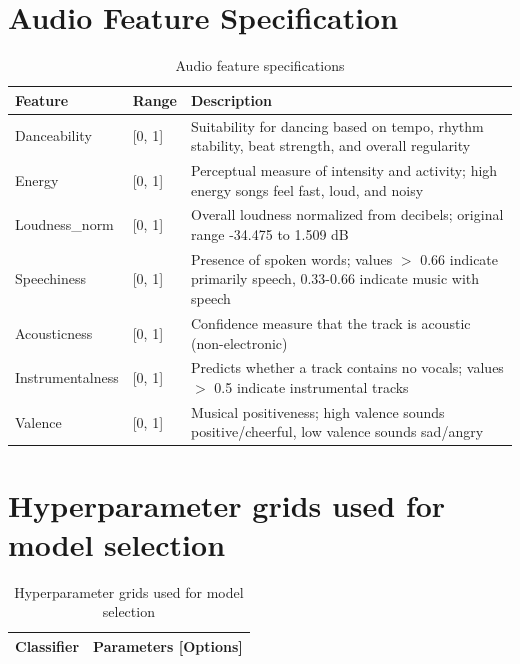 \documentclass{article}
\begin{document}
{{{{{{{\section{Audio Feature Specification}
\begin{table}[h]
\centering
\caption{Audio feature specifications}
\label{tab:Audio Feature} 
\begin{tabular}{p{3.5cm}p{2cm}p{6cm}}
\toprule
\textbf{Feature} & \textbf{Range} & \textbf{Description} \\
\midrule
Danceability & [0, 1] & Suitability for dancing based on tempo, rhythm stability, beat strength, and overall regularity \\
\midrule
Energy & [0, 1] & Perceptual measure of intensity and activity; high energy songs feel fast, loud, and noisy \\
\midrule
Loudness\_norm & [0, 1] & Overall loudness normalized from decibels; original range -34.475 to 1.509 dB \\
\midrule
Speechiness & [0, 1] & Presence of spoken words; values $>$ 0.66 indicate primarily speech, 0.33-0.66 indicate music with speech \\
\midrule
Acousticness & [0, 1] & Confidence measure that the track is acoustic (non-electronic) \\
\midrule
Instrumentalness & [0, 1] & Predicts whether a track contains no vocals; values $>$ 0.5 indicate instrumental tracks \\
\midrule
Valence & [0, 1] & Musical positiveness; high valence sounds positive/cheerful, low valence sounds sad/angry \\
\bottomrule
\end{tabular}
\end{table}

\section{Hyperparameter grids used for model selection}

\begin{table}[h!]
\centering
\caption{Hyperparameter grids used for model selection}
\label{tab:HyperGrids} 
\setlength{\tabcolsep}{6pt}
\renewcommand{\arraystretch}{1.25}

\begin{tabular}{p{} p{} p{}}
\toprule
\textbf{Classifier} & \multicolumn{2}{c}{\textbf{Parameters [Options]}} \\
\midrule


\end{tabular}
\end{table}}}}}}}}
\end{document}
